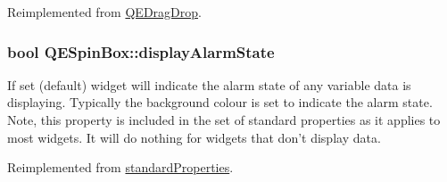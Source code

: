 Reimplemented from \hyperlink{classQEDragDrop}{QEDragDrop}.

\hypertarget{classQESpinBox_a951a2bf579836bd159c9deb38a40f8a9}{
\subsubsection[{displayAlarmState}]{\setlength{\rightskip}{0pt plus 5cm}bool QESpinBox::displayAlarmState}}
\label{classQESpinBox_a951a2bf579836bd159c9deb38a40f8a9}
If set (default) widget will indicate the alarm state of any variable data is displaying. Typically the background colour is set to indicate the alarm state. Note, this property is included in the set of standard properties as it applies to most widgets. It will do nothing for widgets that don't display data. 

Reimplemented from \hyperlink{classstandardProperties}{standardProperties}.

